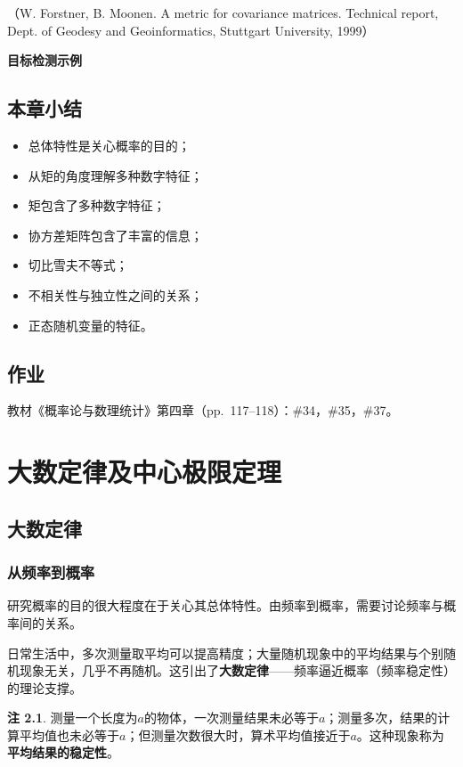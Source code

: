 \documentclass[11pt,a4paper]{report}
\theoremstyle{definition}
\newtheorem{note}{注}[chapter]
\begin{document}
（W. Forstner, B. Moonen. A metric for covariance matrices. Technical report, Dept. of Geodesy and Geoinformatics, Stuttgart University, 1999）

\textbf{目标检测示例}

\section{本章小结}

\begin{itemize}[leftmargin=2em]
    \item 总体特性是关心概率的目的；
    \item 从矩的角度理解多种数字特征；
    \item 矩包含了多种数字特征；
    \item 协方差矩阵包含了丰富的信息；
    \item 切比雪夫不等式；
    \item 不相关性与独立性之间的关系；
    \item 正态随机变量的特征。
\end{itemize}

\section*{作业}


教材《概率论与数理统计》第四章（pp.~117--118）：\#34，\#35，\#37。

\newpage
\chapter{大数定律及中心极限定理}

\section{大数定律}

\subsection{从频率到概率}

研究概率的目的很大程度在于关心其总体特性。由频率到概率，需要讨论频率与概率间的关系。

日常生活中，多次测量取平均可以提高精度；大量随机现象中的平均结果与个别随机现象无关，几乎不再随机。这引出了\textbf{大数定律}——频率逼近概率（频率稳定性）的理论支撑。

\begin{note}
测量一个长度为$a$的物体，一次测量结果未必等于$a$；测量多次，结果的计算平均值也未必等于$a$；但测量次数很大时，算术平均值接近于$a$。这种现象称为\textbf{平均结果的稳定性}。
\end{note}
\end{document}
